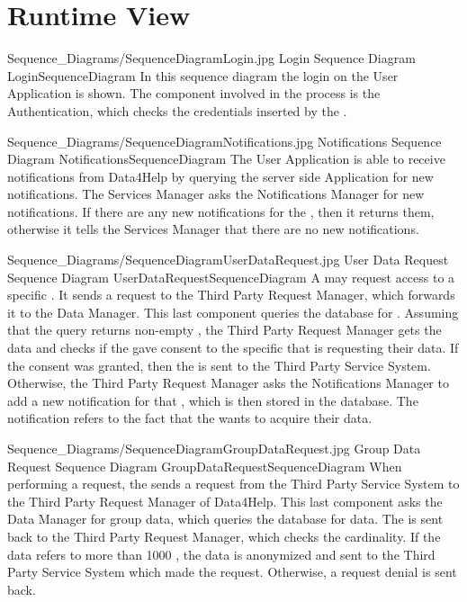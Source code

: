 \documentclass[../../DD.tex]{subfiles}
\begin{document}
\section{Runtime View\label{sect:2.4}}


	\image {13cm} {Sequence_Diagrams/SequenceDiagramLogin.jpg} {Login Sequence Diagram} {LoginSequenceDiagram}
	In this sequence diagram the  login on the User Application is shown. The component involved in the process is the Authentication, which checks the credentials inserted by the .

	\image {13cm} {Sequence_Diagrams/SequenceDiagramNotifications.jpg} {Notifications Sequence Diagram} {NotificationsSequenceDiagram}
	The User Application is able to receive notifications from Data4Help by querying the server side Application for new notifications. The Services Manager asks the Notifications Manager for new notifications. If there are any new notifications for the , then it returns them, otherwise it tells the Services Manager that there are no new notifications.

	\image {13cm} {Sequence_Diagrams/SequenceDiagramUserDataRequest.jpg} {User Data Request Sequence Diagram} {UserDataRequestSequenceDiagram}
	A  may request access to a specific . It sends a request to the Third Party Request Manager, which forwards it to the Data Manager. This last component queries the database for . Assuming that the query returns non-empty , the Third Party Request Manager gets the data and checks if the  gave consent to the specific  that is requesting their data. If the consent was granted, then the  is sent to the Third Party Service System. Otherwise, the Third Party Request Manager asks the Notifications Manager to add a new notification for that , which is then stored in the database. The notification refers to the fact that the  wants to acquire their data.

	\image {13cm} {Sequence_Diagrams/SequenceDiagramGroupDataRequest.jpg} {Group Data Request Sequence Diagram} {GroupDataRequestSequenceDiagram}
	When performing a  request, the  sends a request from the Third Party Service System to the Third Party Request Manager of Data4Help. This last component asks the Data Manager for group data, which queries the database for data. The  is sent back to the Third Party Request Manager, which checks the cardinality. If the data refers to more than 1000 , the data is anonymized and sent to the Third Party Service System which made the request. Otherwise, a request denial is sent back.
	
\end{document}
